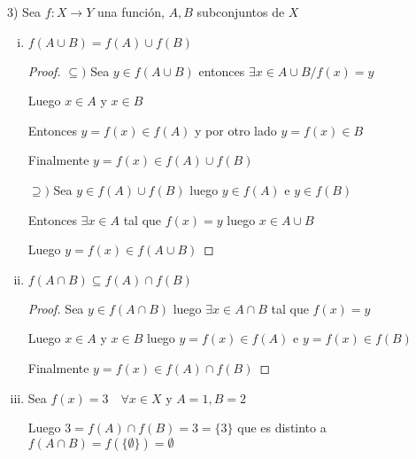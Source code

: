 \documentclass[12pt]{article}
\newcommand{\ra}{\rightarrow}
\theoremstyle{definition}
\begin{document}
3) Sea $f : X \ra Y$ una función, $A, B $ subconjuntos de $X$
\begin{enumerate}[i.]
  \item $f(A \cup B) = f(A) \cup f(B)$
    \begin{proof}
      $\subseteq )$ Sea $y \in f(A \cup B)$ entonces $\exists x \in A \cup B /  f(x) = y$ 

      Luego $x \in A$ y $ x \in B$ 

     Entonces  $ y = f(x) \in f(A)$ y por otro lado $y = f(x) \in B$

     Finalmente $y = f(x) \in f(A) \cup f(B)$

   $\supseteq )$ Sea $y \in f(A) \cup f(B)$ luego $y \in f(A)$ e $y \in f(B)$

   Entonces $\exists x \in A  $ tal que $ f(x) = y $ luego $ x \in A \cup B$

   Luego $y = f(x) \in f(A \cup B)$
    \end{proof}

  \item $f(A \cap B) \subseteq f(A) \cap f(B)$

    \begin{proof}
      Sea $ y \in f(A \cap B)$ luego $\exists x \in A \cap B$ tal que $f(x) = y$

Luego	$x \in A $ y $x \in B$ luego $y = f(x) \in f(A)$ e $y = f(x) \in f(B)$

Finalmente $y = f(x) \in f(A) \cap f(B)$ 
    \end{proof}

  \item Sea $f(x) = 3 \quad \forall x \in X$ y $A = {1}, B={2}$

    Luego $3 = f(A) \cap f(B) = 3 = \{3\} $ que es distinto a $f(A \cap B) = f(\{\emptyset\}) = \emptyset$

\end{enumerate}
\end{document}
